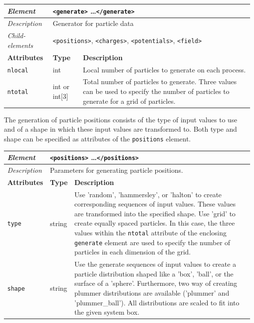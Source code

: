 \begin{center}
\small
\begin{tabular}{|p{3cm}|p{1.5cm}|p{8.5cm}|}
  \hline
  \textit{Element}        & \multicolumn{2}{p{10cm}|}{\texttt{<generate>} \dots \texttt{</generate>}} \\ \hline
  \textit{Description}    & \multicolumn{2}{p{10cm}|}{Generator for particle data} \\ \hline
  \textit{Child-elements} & \multicolumn{2}{p{10cm}|}{\texttt{<positions>}, \texttt{<charges>}, \texttt{<potentials>}, \texttt{<field>}} \\ \hline
  \hline
  \textbf{Attributes}     & \textbf{Type} & \textbf{Description} \\ \hline
  \texttt{nlocal}         & int           & Local number of particles to generate on each process. \\ \hline
  \texttt{ntotal}         & int or int[3] & Total number of particles to generate. Three values can be used to specify the number of particles to generate for a grid of particles. \\ \hline
\end{tabular}
\end{center}

\noindent
The generation of particle positions consists of the type of input values to use and of a shape in which these input values are transformed to.
Both type and shape can be specified as attributes of the \texttt{positions} element.

\begin{center}
\small
\begin{tabular}{|p{3cm}|p{1.5cm}|p{8.5cm}|}
  \hline
  \textit{Element}        & \multicolumn{2}{p{10cm}|}{\texttt{<positions>} \dots \texttt{</positions>}} \\ \hline
  \textit{Description}    & \multicolumn{2}{p{10cm}|}{Parameters for generating particle positions.} \\ \hline
  \hline
  \textbf{Attributes}     & \textbf{Type} & \textbf{Description} \\ \hline
  \texttt{type}           & string        & Use 'random', 'hammersley', or 'halton' to create corresponding sequences of input values. These values are transformed into the specified shape. Use 'grid' to create equally spaced particles. In this case, the three values within the \texttt{ntotal} attribute of the enclosing \texttt{generate} element are used to specify the number of particles in each dimension of the grid.
 \\ \hline
  \texttt{shape}          & string        & Use the generate sequences of input values to create a particle distribution shaped like a 'box', 'ball', or the surface of a 'sphere'. Furthermore, two way of creating plummer distributions are available ('plummer' and 'plummer\_ball'). All distributions are scaled to fit into the given system box. \\ \hline
\end{tabular}
\end{center}

